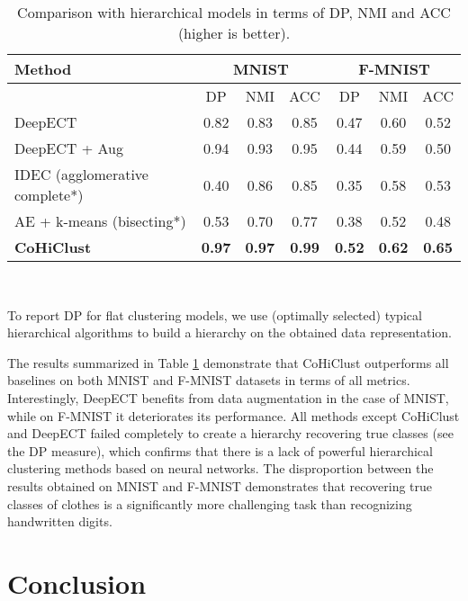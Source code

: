 \documentclass[runningheads]{llncs}
\def\our{CoHiClust}
\begin{document}
\begin{table}[!htb]
    \begin{center}
    \caption{Comparison with hierarchical models in terms of DP, NMI and ACC (higher is better).
} \label{tab:hier}
\begin{tabular}{lcccccc}
\toprule
    Method & \multicolumn{3}{c}{MNIST} & \multicolumn{3}{c}{F-MNIST} \\
    \midrule
     & DP & NMI & ACC & DP & NMI & ACC \\
    \midrule
    DeepECT & 0.82 & 0.83 & 0.85 & 0.47 & 0.60 & 0.52 \\
    DeepECT + Aug & 0.94 & 0.93 & 0.95 & 0.44 & 0.59 & 0.50 \\
    IDEC (agglomerative complete*) & 0.40 & 0.86 & 0.85 & 0.35 & 0.58 & 0.53 \\
    AE + k-means (bisecting*) & 0.53 & 0.70 & 0.77 & 0.38 & 0.52 & 0.48 \\
    {\bf \our{}} & {\bf 0.97} & {\bf 0.97} & {\bf 0.99} & {\bf 0.52} & {\bf 0.62} & {\bf 0.65} \\
    \bottomrule
    \end{tabular}\\
    \end{center}
    \footnotesize * To report DP for flat clustering models, we use (optimally selected) typical hierarchical algorithms to build a hierarchy on the obtained data representation.
\end{table}


The results summarized in Table \ref{tab:hier} demonstrate that \our{} outperforms all baselines on both MNIST and F-MNIST datasets in terms of all metrics. Interestingly, DeepECT benefits from data augmentation in the case of MNIST, while on F-MNIST it deteriorates its performance. All methods except \our{} and DeepECT failed completely to create a hierarchy recovering true classes (see the DP measure), which confirms that there is a lack of powerful hierarchical clustering methods based on neural networks. The disproportion between the results obtained on MNIST and F-MNIST demonstrates that recovering true classes of clothes is a significantly more challenging task than recognizing handwritten digits. 









\section{Conclusion}
\end{document}
